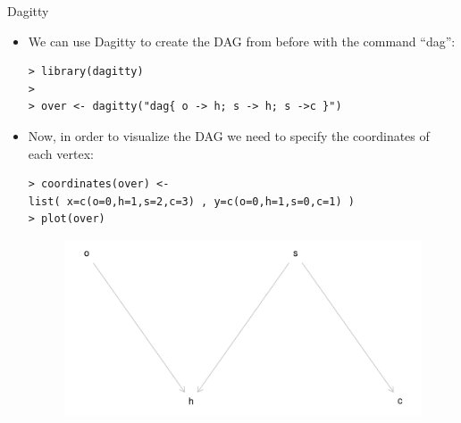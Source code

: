 \documentclass[handout]{beamer}
\begin{document}
\begin{frame}[fragile]{Dagitty}
\scriptsize{
\begin{itemize}



\item We can use Dagitty to create the DAG from before with the command ``dag'':

\begin{verbatim}
> library(dagitty)
> 
> over <- dagitty("dag{ o -> h; s -> h; s ->c }")
\end{verbatim}


\item Now, in order to visualize the DAG we need to specify the coordinates of each vertex:

\begin{verbatim}
> coordinates(over) <- 
list( x=c(o=0,h=1,s=2,c=3) , y=c(o=0,h=1,s=0,c=1) )
> plot(over)  
\end{verbatim}

\begin{figure}[h!]
	\centering
	\includegraphics[scale=0.4]{pics/overdag1.pdf}
	\end{figure} 



\end{itemize}





} 

\end{frame}
\end{document}
